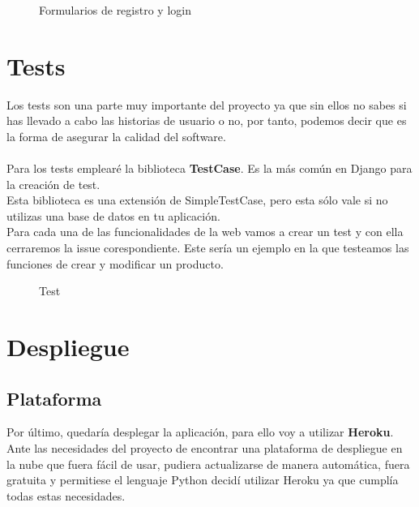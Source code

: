 \begin{figure}[H]
  \centering
  \noindent{}
  \caption{Formularios de registro y login}
\end{figure}

\newpage
\section{Tests} \label{sec:tests}

Los tests son una parte muy importante del proyecto ya que sin ellos no sabes si has llevado a cabo las historias de usuario o no, por tanto, 
podemos decir que es la forma de asegurar la calidad del software. \\ \\

Para los tests emplearé la biblioteca \textbf{TestCase}. Es la más común en Django para la creación de test.\\
Esta biblioteca es una extensión de SimpleTestCase, pero esta sólo vale si no utilizas una base de datos 
en tu aplicación.\\

Para cada una de las funcionalidades de la web vamos a crear un test y con ella cerraremos la issue corespondiente.
Este sería un ejemplo en la que testeamos las funciones de crear y modificar un producto.

\begin{figure}[H]
  \centering
  \noindent{}
  \caption{Test}
\end{figure}

\section{Despliegue} \label{sec:despliegue}

\subsection{Plataforma}

Por último, quedaría desplegar la aplicación, para ello voy a utilizar \textbf{Heroku}.\\

Ante las necesidades del proyecto de encontrar una plataforma de despliegue en la nube que fuera fácil de usar, pudiera actualizarse de manera automática, fuera gratuita y permitiese el lenguaje Python decidí utilizar Heroku ya que cumplía todas estas necesidades. 

